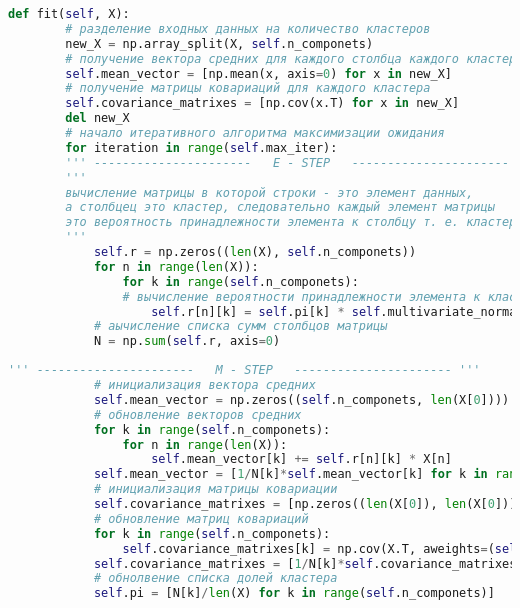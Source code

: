 \begin{lstlisting}[language=Python, caption=Реализация модели Гауссовой смеси.]
	def fit(self, X):
		# разделение входных данных на количество кластеров
		new_X = np.array_split(X, self.n_componets)
		# получение вектора средних для каждого столбца каждого кластера
		self.mean_vector = [np.mean(x, axis=0) for x in new_X]
		# получение матрицы ковариаций для каждого кластера
		self.covariance_matrixes = [np.cov(x.T) for x in new_X]
		del new_X
		# начало итеративного алгоритма максимизации ожидания
		for iteration in range(self.max_iter):
		''' ----------------------   E - STEP   ---------------------- '''
		'''
		вычисление матрицы в которой строки - это элемент данных,
		а столбцец это кластер, следовательно каждый элемент матрицы
		это вероятность принадлежности элемента к столбцу т. е. кластеру
		'''
			self.r = np.zeros((len(X), self.n_componets))
			for n in range(len(X)):
				for k in range(self.n_componets):
				# вычисление вероятности принадлежности элемента к кластеру
					self.r[n][k] = self.pi[k] * self.multivariate_normal(X[n], self.mean_vector[k], self.covariance_matrixes[k]) / sum([self.pi[j]*self.multivariate_normal(X[n], self.mean_vector[j], self.covariance_matrixes[j]) for j in range(self.n_componets)])
			# аычисление списка сумм столбцов матрицы
			N = np.sum(self.r, axis=0)
\end{lstlisting}
\pagebreak

\begin{lstlisting}[language=Python, caption=Реализация модели Гауссовой смеси.]
		''' ----------------------   M - STEP   ---------------------- '''
			# инициализация вектора средних
			self.mean_vector = np.zeros((self.n_componets, len(X[0])))
			# обновление векторов средних
			for k in range(self.n_componets):
				for n in range(len(X)):
					self.mean_vector[k] += self.r[n][k] * X[n]
			self.mean_vector = [1/N[k]*self.mean_vector[k] for k in range(self.n_componets)]
			# инициализация матрицы ковариации
			self.covariance_matrixes = [np.zeros((len(X[0]), len(X[0]))) for k in range(self.n_componets)]
			# обновление матриц ковариаций
			for k in range(self.n_componets):
				self.covariance_matrixes[k] = np.cov(X.T, aweights=(self.r[:, k]), ddof=0)
			self.covariance_matrixes = [1/N[k]*self.covariance_matrixes[k] for k in range(self.n_componets)]
			# обнолвение списка долей кластера
			self.pi = [N[k]/len(X) for k in range(self.n_componets)]
\end{lstlisting}

\renewcommand\thelstlisting{\arabic{lstlisting}}
\setcounter{lstlisting}{2}


\pagebreak